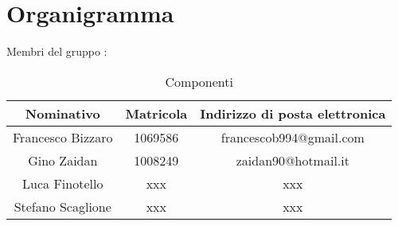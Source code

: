 \section{Organigramma}


Membri del gruppo \GRUPPO:
\begin{table}[h]
\centering
\bgroup
\def\arraystretch{1.6}
	\begin{tabular}{| c | c | c |}
		\hline 
		\rowcolor{LightCyan}
		\textbf{Nominativo} & \textbf{Matricola} & \textbf{Indirizzo di posta 
		elettronica} \\ \hline \hline 
		Francesco Bizzaro & 1069586 & francescob994@gmail.com  \\ \hline  
		Gino Zaidan & 1008249 & zaidan90@hotmail.it  \\ \hline 
		Luca Finotello & xxx & xxx  \\ \hline
		Stefano Scaglione & xxx & xxx  \\ \hline
	\end{tabular}
\egroup
\caption{Componenti}
\end{table}